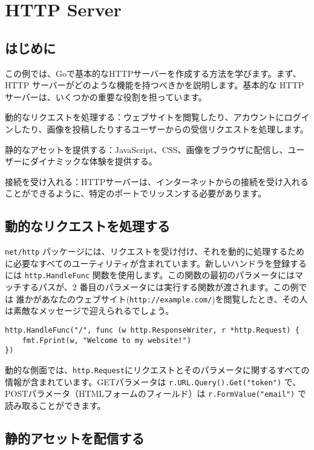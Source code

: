 \section{HTTP Server}

\subsection{はじめに}

この例では、Goで基本的なHTTPサーバーを作成する方法を学びます。まず、HTTP サーバーがどのような機能を持つべきかを説明します。基本的な HTTP サーバーは、いくつかの重要な役割を担っています。

動的なリクエストを処理する：ウェブサイトを閲覧したり、アカウントにログインしたり、画像を投稿したりするユーザーからの受信リクエストを処理します。

静的なアセットを提供する：JavaScript、CSS、画像をブラウザに配信し、ユーザーにダイナミックな体験を提供する。

接続を受け入れる：HTTPサーバーは、インターネットからの接続を受け入れることができるように、特定のポートでリッスンする必要があります。

\subsection{動的なリクエストを処理する}

\texttt{net/http} パッケージには、リクエストを受け付け、それを動的に処理するために必要なすべてのユーティリティが含まれています。新しいハンドラを登録するには \texttt{http.HandleFunc} 関数を使用します。この関数の最初のパラメータにはマッチするパスが、2 番目のパラメータには実行する関数が渡されます。この例では 誰かがあなたのウェブサイト(\texttt{http://example.com/})を閲覧したとき、その人は素敵なメッセージで迎えられるでしょう。


\begin{lstlisting}[numbers=none]
http.HandleFunc("/", func (w http.ResponseWriter, r *http.Request) {
    fmt.Fprint(w, "Welcome to my website!")
})
\end{lstlisting}

動的な側面では、\texttt{http.Request}にリクエストとそのパラメータに関するすべての情報が含まれています。GETパラメータは \texttt{r.URL.Query().Get("token")} で、POSTパラメータ（HTMLフォームのフィールド）は \texttt{r.FormValue("email")} で読み取ることができます。

\subsection{静的アセットを配信する}

